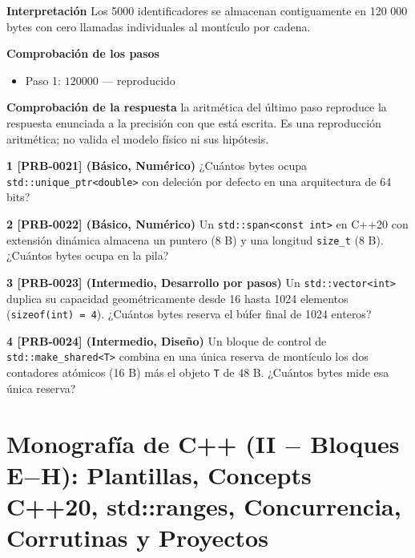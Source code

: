 \documentclass{book}
\begin{document}
\begin{tcolorbox}[title={Problema resuelto}, studiumworked, breakable]
\noindent\textbf{Interpretación}
Los 5000 identificadores se almacenan contiguamente en 120 000 bytes con cero llamadas individuales al montículo por cadena.

\noindent\textbf{Comprobación de los pasos}
\begin{itemize}
\item Paso 1: $120000$ — reproducido
\end{itemize}

\noindent\textbf{Comprobación de la respuesta} la aritmética del último paso reproduce la respuesta enunciada a la precisión con que está escrita. Es una reproducción aritmética; no valida el modelo físico ni sus hipótesis.
\end{tcolorbox}

\begin{tcolorbox}[title={Ejercicios}, studiumworked, breakable]

\noindent\textbf{1 [PRB-0021] (Básico, Numérico)}
¿Cuántos bytes ocupa \texttt{std::unique\_ptr<double>} con deleción por defecto en una arquitectura de 64 bits?

\noindent\textbf{2 [PRB-0022] (Básico, Numérico)}
Un \texttt{std::span<const int>} en C++20 con extensión dinámica almacena un puntero (8 B) y una longitud \texttt{size\_t} (8 B). ¿Cuántos bytes ocupa en la pila?

\noindent\textbf{3 [PRB-0023] (Intermedio, Desarrollo por pasos)}
Un \texttt{std::vector<int>} duplica su capacidad geométricamente desde 16 hasta 1024 elementos (\texttt{sizeof(int) = 4}). ¿Cuántos bytes reserva el búfer final de 1024 enteros?

\noindent\textbf{4 [PRB-0024] (Intermedio, Diseño)}
Un bloque de control de \texttt{std::make\_shared<T>} combina en una única reserva de montículo los dos contadores atómicos (16 B) más el objeto \texttt{T} de 48 B. ¿Cuántos bytes mide esa única reserva?
\end{tcolorbox}

\chapter{Monografía de C++ (II \(-\) Bloques E\(-\)H): Plantillas, Concepts C++20, std::ranges, Concurrencia, Corrutinas y Proyectos}
\label{chap:cap05-cpp-templates-concepts-ranges-concurrencia-proyectos}
\end{document}
